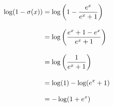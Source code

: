 \begin{equation*}
    \setlength{\jot}{\baselineskip}
    \begin{split}
        \log(1-\sigma(x)) &= \log\left(1-\frac{e^x}{e^x+1}\right)
        \\ &= \log\left(\frac{e^x+1-e^x}{e^x+1}\right)
        \\ &= \log\left(\frac{1}{e^x+1}\right)
        \\ &= \log(1) - \log(e^x+1) \\ &= -\log(1+e^x)
    \end{split}
\end{equation*}